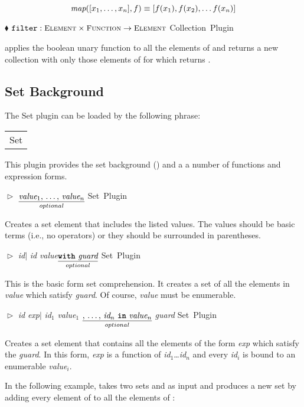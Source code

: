 \documentclass{article}
\newcommand{\codebf}[1]{\xspace{\bf \code{#1}}\xspace}
\newcommand{\keyword}[1]{\codebf{#1}}
\newcommand{\funcform}[2]{\pform{$\blacklozenge$}{#1}{#2}}
\newcommand{\opform}[2]{\pform{$\vartriangleright$}{#1}{#2}}
\newcommand{\pform}[3]{\vspace*{4mm} \noindent #1 #2 \vspace{1mm}\textcolor[gray]{0.7}{\dotfill}\mbox{{\sffamily \footnotesize #3}}}
\newcommand{\bExample}{\begin{small} \vspace{0.3cm} \begin{tabular}{|l} \begin{minipage}{0.85\textwidth} \vspace{0.2cm} \ttfamily}
\newcommand{\eExample}{\vspace{0.2cm} \end{minipage} \end{tabular} \vspace{0.3cm} \end{small}}
\newcommand{\optional}[1]{$\underset{optional}{\underline{\mbox{#1}}}$}
\renewcommand{\id}{{\em id}\xspace}
\newcommand{\val}{{\em value}\xspace}
\newcommand{\guard}{{\em guard}\xspace}
\newcommand{\idi}[1]{{\em id}$_{#1}$\xspace}
\newcommand{\valuei}[1]{{\em value}$_{#1}$\xspace}
\begin{document}
\[ \mbox{\it map} ([x_1,\ldots,x_n], f) \equiv [ f(x_1), f(x_2), \ldots f(x_n) ] \] 

\funcform{$\mbox{{\ttfamily filter}} : \mbox{\scshape\small Element} \times \mbox{\scshape\small Function} \rightarrow \mbox{\scshape\small Element}$}{Collection Plugin}

 applies the boolean unary function  to all the elements of  and returns a new collection with only those elements of  for which  returns . 


\subsection{Set Background}
\label{set}

The Set plugin can be loaded by the following \keyword{use} phrase:

\bExample
	\codebf{use} Set
\eExample

\noindent This plugin provides the set background () and
a a number of functions and expression forms. 

\opform{\code{\{} \optional{\valuei{1}, \ldots, \valuei{n}} \code{\}}}{Set Plugin}

Creates a set element that includes the listed values. The values should be basic terms (i.e., no operators) or
they should be surrounded in parentheses.

\opform{\code{\{} \id $|$ \id \codebf{in} \val \optional{\codebf{with} \guard} \code{\}}}{Set Plugin}

This is the basic form set comprehension. It creates a set of all the elements in \val
which satisfy \guard. Of course, \val must be enumerable.

\opform{\code{\{} \id \codebf{is} {\em exp}\xspace $|$ \idi{1} \codebf{in} \valuei{1} 
		\optional{, \ldots, \idi{n} \codebf{in} \valuei{n}} \codebf{with} \guard \code{\}}}{Set Plugin}

Creates a set element that contains all the elements of the form {\em exp} which
satisfy the \guard. In this form, {\em exp} is a function of \idi{1}\ldots \idi{n} and 
every \idi{i} is bound to an enumerable \valuei{i}. 

In the following example,  takes two sets  and  as input and produces a new set
by adding every element of  to all the elements of :   
\end{document}
